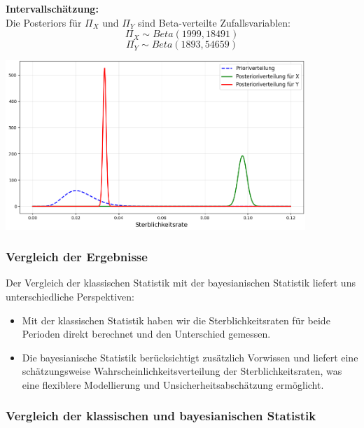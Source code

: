 \documentclass[a4paper,12pt]{article}
\begin{document}
\textbf{Intervallschätzung:} \\ %


Die Posteriors für $\Pi_X$ und $\Pi_Y$ sind Beta-verteilte Zufallsvariablen:
\begin{equation}
  \Pi_X \sim Beta(1999, 18491)
\end{equation}
\begin{equation}
  \Pi_Y \sim Beta(1893, 54659)
\end{equation}

\begin{center}
  \includegraphics[width=0.85\textwidth]{../images/semmelweis.png}
\end{center}



\subsubsection{Vergleich der Ergebnisse}
Der Vergleich der klassischen Statistik mit der bayesianischen Statistik liefert uns unterschiedliche Perspektiven:

\begin{itemize}
    \item Mit der klassischen Statistik haben wir die Sterblichkeitsraten für beide Perioden direkt berechnet und den Unterschied gemessen.
    \item Die bayesianische Statistik berücksichtigt zusätzlich Vorwissen und liefert eine schätzungsweise Wahrscheinlichkeitsverteilung 
    der Sterblichkeitsraten, was eine flexiblere Modellierung und Unsicherheitsabschätzung ermöglicht.
\end{itemize}
\newpage

\subsubsection{Vergleich der klassischen und bayesianischen Statistik}
\end{document}
